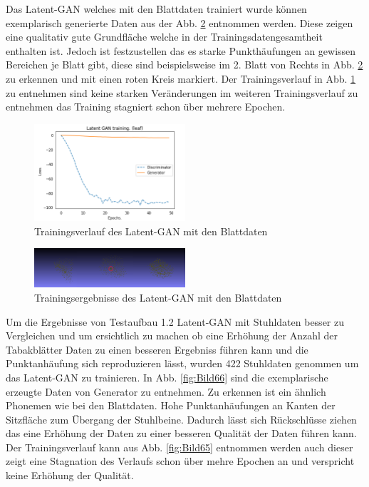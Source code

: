 \documentclass{llncs}
\begin{document}
Das Latent-GAN welches mit den Blattdaten trainiert wurde können exemplarisch generierte Daten aus der Abb. \ref{fig:Bild64} entnommen werden. Diese zeigen eine qualitativ gute Grundfläche welche in der Trainingsdatengesamtheit enthalten ist. Jedoch ist festzustellen das es starke Punkthäufungen an gewissen Bereichen je Blatt gibt, diese sind beispielsweise im 2. Blatt von Rechts in Abb. \ref{fig:Bild64} zu erkennen und mit einen roten Kreis markiert. Der Trainingsverlauf in Abb. \ref{fig:Bild63} zu entnehmen sind keine starken Veränderungen im weiteren Trainingsverlauf zu entnehmen das Training stagniert schon über mehrere Epochen. 
\begin{figure}[htbp] 
	\centering
	\includegraphics[width=0.5\textwidth]{Latent_gan_training_result.png}
	\caption{Trainingsverlauf des Latent-GAN mit den Blattdaten}
	\label{fig:Bild63}
\end{figure}
\begin{figure}[htbp] 
	\centering
	\includegraphics[width=0.5\textwidth]{latent_gan_leaf_example.png}
	\caption{Trainingsergebnisse des Latent-GAN mit den Blattdaten}
	\label{fig:Bild64}
\end{figure}

Um die Ergebnisse von Testaufbau 1.2 Latent-GAN mit Stuhldaten besser zu Vergleichen und um ersichtlich zu machen ob eine Erhöhung der Anzahl der Tabakblätter Daten zu einen besseren Ergebniss führen kann und die Punktanhäufung sich reproduzieren lässt, wurden 422 Stuhldaten genommen um das Latent-GAN zu trainieren. In Abb. \ref{fig:Bild66} sind die exemplarische erzeugte Daten von Generator zu entnehmen. Zu erkennen ist ein ähnlich Phonemen wie bei den Blattdaten. Hohe Punktanhäufungen an Kanten der Sitzfläche zum Übergang der Stuhlbeine. Dadurch lässt sich Rückschlüsse ziehen das eine Erhöhung der Daten zu einer besseren Qualität der Daten führen kann. Der Trainingsverlauf kann aus Abb. \ref{fig:Bild65} entnommen werden auch dieser zeigt eine Stagnation des Verlaufs schon über mehre Epochen an und verspricht keine Erhöhung der Qualität. 
\end{document}
